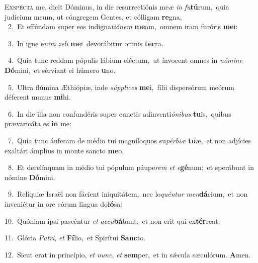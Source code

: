 \lettrine{\initial\textcolor{\initialcolor}{E}}{xspécta} me, dicit Dóminus, in die resurrectiónis me\textit{æ} \textit{in} \textit{fu}\-\textbf{tú}rum,~\star quia judícium meum, ut cóngregem Gentes, et cólligam \textbf{re}\-gna,\\
{\numbfont\textcolor{\numbcolor}{~2.}}~Et effúndam super eos indigna\-\textit{ti}\-\textit{ó}\textit{nem} \textbf{me}\-am,~\star omnem iram furóris \textbf{me}\-i:\par
{\numbfont\textcolor{\numbcolor}{~3.}}~In igne e\textit{nim} \textit{ze}\-\textit{li} \textbf{me}\-i~\star devorábitur omnis \textbf{ter}\-ra.\par
{\numbfont\textcolor{\numbcolor}{~4.}}~Quia tunc reddam pópulis lábium eléctum,~\dagger ut ínvocent omnes in \textit{nó}\-\textit{mi}\textit{ne} \textbf{Dó}\-mini,~\star et sérviant ei húmero \textbf{u}\-no.\par
{\numbfont\textcolor{\numbcolor}{~5.}}~Ultra flúmina Æthiópiæ, inde \textit{súp}\-\textit{pli}\textit{ces} \textbf{me}\-i,~\star fílii dispersórum meórum déferent munus \textbf{mi}\-hi.\par
{\numbfont\textcolor{\numbcolor}{~6.}}~In die illa non confundéris super cunctis adinventi\-\textit{ó}\-\textit{ni}\textit{bus} \textbf{tu}\-is,~\star quibus prævaricáta es \textbf{in} me:\par
{\numbfont\textcolor{\numbcolor}{~7.}}~Quia tunc áuferam de médio tui magníloquos su\-\textit{pér}\-\textit{bi}\textit{æ} \textbf{tu}\-æ,~\star et non adjícies exaltári ámplius in monte sancto \textbf{me}\-o.\par
{\numbfont\textcolor{\numbcolor}{~8.}}~Et derelínquam in médio tui pópulum páupe\textit{rem} \textit{et} \textit{e}\-\textbf{gé}num:~\star et sperábunt in nómine \textbf{Dó}\-mini.\par
{\numbfont\textcolor{\numbcolor}{~9.}}~Relíquiæ Israël non fácient iniquitátem,~\dagger nec lo\-\textit{quén}\-\textit{tur} \textit{men}\-\textbf{dá}cium,~\star et non inveniétur in ore eórum lingua do\-\textbf{ló}\-sa:\par
{\numbfont\textcolor{\numbcolor}{10.}}~Quóniam ipsi pascéntur \textit{et} \textit{ac}\-\textit{cu}\textbf{bá}bunt,~\star et non erit qui ex\-\textbf{tér}\-reat.\par
{\numbfont\textcolor{\numbcolor}{11.}}~Glória \textit{Pa}\-\textit{tri}, \textit{et} \textbf{Fí}\-lio,~\star et Spirítui \textbf{Sanc}\-to.\par
{\numbfont\textcolor{\numbcolor}{12.}}~Sicut erat in princípio, \textit{et} \textit{nunc}\-, \textit{et} \textbf{sem}\-per,~\star et in sǽcula sæculórum. \textbf{A}\-men.\par
